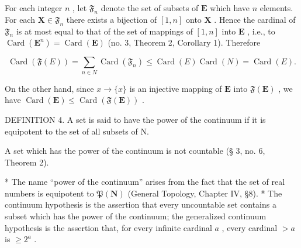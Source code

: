 For each integer \(n\) , let \(\mathfrak{F}_n\) denote the set of subsets of \(\mathbf{E}\) which have \(n\) elements. For each \(\mathbf{X} \in \mathfrak{F}_n\) there exists a bijection of \([1, n]\) onto \(\mathbf{X}\) . Hence the cardinal of \(\mathfrak{F}_n\) is at most equal to that of the set of mappings of \([1, n]\) into \(\mathbf{E}\) , i.e., to \(\operatorname{Card}(\mathbf{E}^n) = \operatorname{Card}(\mathbf{E})\) (no. 3, Theorem 2, Corollary 1). Therefore

\[
\operatorname{Card} (\mathfrak {F} (E)) = \sum_ {n \in N} \operatorname{Card} (\mathfrak {F} _ {n}) \leqslant \operatorname{Card} (E) \operatorname{Card} (N) = \operatorname{Card} (E).
\]

On the other hand, since \(x \to \{x\}\) is an injective mapping of \(\mathbf{E}\) into \(\mathfrak{F}(\mathbf{E})\) , we have \(\operatorname{Card}(\mathbf{E}) \leqslant \operatorname{Card}(\mathfrak{F}(\mathbf{E}))\) .

DEFINITION 4. A set is said to have the power of the continuum if it is equipotent to the set of all subsets of N.

A set which has the power of the continuum is not countable (§ 3, no. 6, Theorem 2).

* The name ``power of the continuum'' arises from the fact that the set of real numbers is equipotent to \(\mathfrak{P}(\mathbf{N})\) (General Topology, Chapter IV, §8). * The continuum hypothesis is the assertion that every uncountable set contains a subset which has the power of the continuum; the generalized continuum hypothesis is the assertion that, for every infinite cardinal \(a\) , every cardinal \(>a\) is \(\geqslant 2^{a}\) .

